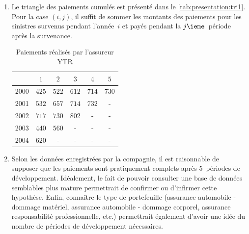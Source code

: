 \begin{exercice}
\begin{rep}
\begin{enumerate}
    \end{enumerate}
  \end{rep}
  \begin{sol}
    \begin{enumerate}
    \item Le triangle des paiements cumulés est présenté dans le
      \autoref{tab:presentation:tri1}. Pour la case $(i, j)$, il suffit de
      sommer les montants des paiements pour les sinistres survenus
      pendant l'année~$i$ et payés pendant la $j\ieme$~période après
      la survenance.
      \begin{table}[!h]
        \centering
        \caption{Paiements réalisés par l'assureur YTR}
        \label{tab:presentation:tri1}
        \begin{tabular}{cccccc}
          \toprule
          & $1$ & $2$ & $3$ & $4$ & $5$\\
          \midrule
          2000 & $425$ & $522$ & $612$ & $714$ & $730$\\
          2001 & $532$ & $657$ & $714$ & $732$ & -\\
          2002 & $717$ & $730$ & $802$ & - & -\\
          2003 & $440$ & $560$ & - & - & -\\
          2004 & $620$ & - & - & - & -\\
          \bottomrule
        \end{tabular}
      \end{table}
    \item Selon les données enregistrées par la compagnie, il est
      raisonnable de supposer que les paiements sont pratiquement
      complets après $5$~périodes de développement. Idéalement, le
      fait de pouvoir consulter une base de données semblables plus
      mature permettrait de confirmer ou d'infirmer cette hypothèse.
      Enfin, connaître le type de portefeuille (assurance automobile -
      dommage matériel, assurance automobile - dommage corporel,
      assurance responsabilité professionnelle, etc.) permettrait
      également d'avoir une idée du nombre de périodes de
      développement nécessaires.
    \end{enumerate}
  \end{sol}
\end{exercice}

